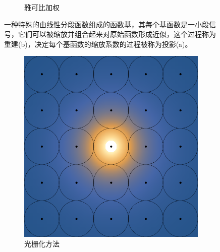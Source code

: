 \begin{figure}
\begin{fullwidth}
\begin{subfigure}[b]{0.245\thewidth}
			\caption{雅可比加权}
	\end{subfigure}
	\caption{一种特殊的由线性分段函数组成的函数基，其每个基函数是一小段信号，它们可以被缩放并组合起来对原始函数形成近似，这个过程称为重建(b)，决定每个基函数的缩放系数的过程被称为投影(a)。}
	\label{f:pl-reconstruction-comparation}
\end{fullwidth}
\end{figure}





\begin{figure}
	\begin{subfigure}[b]{0.325\textwidth}
		\includegraphics[width=\textwidth]{figures/pl/sampling-raster}
		\caption{光栅化方法}
	\end{subfigure}
	\begin{subfigure}[b]{0.325\textwidth}

\end{subfigure}
\end{figure}
